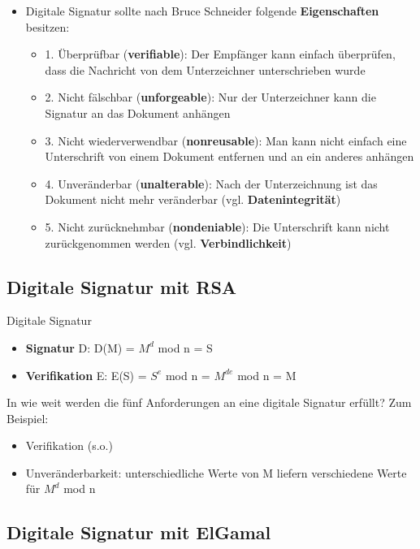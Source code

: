 \documentclass[openany]{book}
\begin{document}
\begin{itemize}
    \item Digitale Signatur sollte nach Bruce Schneider folgende \textbf{Eigenschaften} besitzen:
    \begin{itemize}
        \item 1. Überprüfbar (\textbf{verifiable}): Der Empfänger kann einfach überprüfen, dass die Nachricht von dem Unterzeichner unterschrieben wurde
        \item 2. Nicht fälschbar (\textbf{unforgeable}): Nur der Unterzeichner kann die Signatur an das Dokument anhängen
        \item 3. Nicht wiederverwendbar (\textbf{nonreusable}): Man kann nicht einfach eine Unterschrift von einem Dokument entfernen und an ein anderes anhängen
        \item 4. Unveränderbar (\textbf{unalterable}): Nach der Unterzeichnung ist das Dokument nicht mehr veränderbar (vgl. \textbf{Datenintegrität})
        \item 5. Nicht zurücknehmbar (\textbf{nondeniable}): Die Unterschrift kann nicht zurückgenommen werden (vgl. \textbf{Verbindlichkeit}) 
    \end{itemize}
\end{itemize}

\subsection{Digitale Signatur mit RSA}

Digitale Signatur

\begin{itemize}
    \item \textbf{Signatur} D: D(M) = $M^d$ mod n = S
    \item \textbf{Verifikation} E: E(S) = $S^e$ mod n = $M^{de}$ mod n = M
\end{itemize}

In wie weit werden die fünf Anforderungen an eine digitale Signatur erfüllt? Zum Beispiel:

\begin{itemize}
    \item Verifikation (s.o.)
    \item Unveränderbarkeit: unterschiedliche Werte von M liefern verschiedene Werte für $M^d$ mod n
\end{itemize}

\subsection{Digitale Signatur mit ElGamal}
\end{document}
